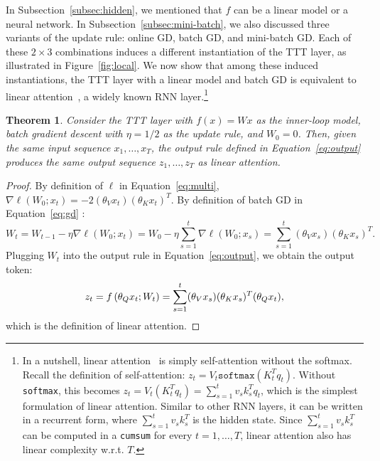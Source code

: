 \documentclass{article}
\newtheorem{theorem}{Theorem}
\begin{document}
In Subsection~\ref{subsec:hidden}, we mentioned that $f$ can be a linear model or a neural network.
In Subsection~\ref{subsec:mini-batch}, we also discussed three variants of the update rule: online GD, batch GD, and mini-batch GD.
Each of these $2\times 3$ combinations induces a different instantiation of the TTT layer, as illustrated in Figure~\ref{fig:local}.
We now show that among these induced instantiations, the TTT layer with a linear model and batch GD is equivalent to linear attention~\cite{katharopoulos2020transformers}, a widely known RNN layer.\footnote{
In a nutshell, linear attention~\cite{katharopoulos2020transformers} is simply self-attention without the softmax.
Recall the definition of self-attention:
$z_t = V_t\texttt{softmax}\left(K^T_tq_t\right)$.
Without \texttt{softmax}, this becomes 
$z_t = V_t\left(K^T_tq_t\right)
=\sum_{s=1}^t v_s k_s^T q_t$, which is the simplest formulation of linear attention.
Similar to other RNN layers, it can be written in a recurrent form, where $\sum_{s=1}^t v_s k_s^T$ is the hidden state.
Since $\sum_{s=1}^t v_s k_s^T$ can be computed in a \texttt{cumsum} for every $t=1,\dots,T$, linear attention also has linear complexity w.r.t. $T$.
}
\begin{theorem}
\label{theorem:la}
Consider the TTT layer with $f(x) = Wx$ as the inner-loop model, batch gradient descent with $\eta=1/2$ as the update rule, and $W_0=0$. Then, given the same input sequence $x_1,\dots,x_T$, the output rule defined in Equation~\ref{eq:output} produces the same output sequence $z_1,\dots,z_T$ as linear attention.
\end{theorem}
\begin{proof}
By definition of $\ell$ in Equation~\ref{eq:multi},
$\nabla \ell\left(W_0; x_t\right) = -2(\theta_V x_t) (\theta_K x_t)^T$.
By definition of batch GD in Equation~\ref{eq:gd}
\vspace{-2ex}:
$$
W_t = W_{t-1} - \eta\nabla \ell\left(W_0; x_t\right)  
= W_0 - \eta\sum_{s=1}^t\nabla \ell\left(W_0; x_s\right)
= \sum_{s=1}^t (\theta_V x_s) (\theta_K x_s)^T.
$$
Plugging $W_t$ into the output rule in Equation~\ref{eq:output}, we obtain the output token:
$$
z_t = f\left(\theta_Qx_t; W_t\right) = \sum_{s=1}^t (\theta_V x_s) (\theta_K x_s)^T (\theta_Qx_t),
\vspace{-1ex}
$$
which is the definition of linear attention.
\end{proof}
\end{document}
